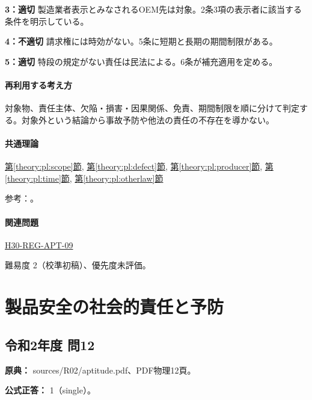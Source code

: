 \noindent\textbf{3：適切} 製造業者表示とみなされるOEM先は対象。2条3項の表示者に該当する条件を明示している。\par

\noindent\textbf{4：不適切} 請求権には時効がない。5条に短期と長期の期間制限がある。\par

\noindent\textbf{5：適切} 特段の規定がない責任は民法による。6条が補充適用を定める。\par

\paragraph{再利用する考え方} 対象物、責任主体、欠陥・損害・因果関係、免責、期間制限を順に分けて判定する。対象外という結論から事故予防や他法の責任の不存在を導かない。

\paragraph{共通理論} \hyperref[theory:pl:scope]{第\ref*{theory:pl:scope}節}, \hyperref[theory:pl:defect]{第\ref*{theory:pl:defect}節}, \hyperref[theory:pl:producer]{第\ref*{theory:pl:producer}節}, \hyperref[theory:pl:time]{第\ref*{theory:pl:time}節}, \hyperref[theory:pl:otherlaw]{第\ref*{theory:pl:otherlaw}節}

\par 参考：\cite{pl_statute,pl_qa,pl_transition2020}。

\paragraph{関連問題} \hyperref[q:h30-reg-apt-09]{H30-REG-APT-09}

\par 難易度 2（校準初稿）、優先度未評価。

\section{製品安全の社会的責任と予防}

\subsection{令和2年度 問12}
\label{q:r02-reg-apt-12}

\noindent\textbf{原典：} sources/R02/aptitude.pdf、PDF物理12頁。

\textbf{公式正答：} 1（single）。


